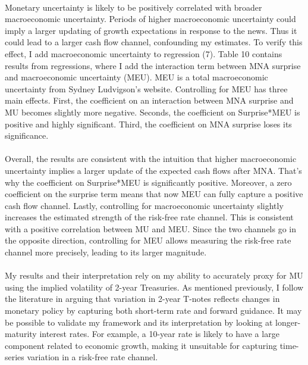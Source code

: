 \documentclass[12pt]{article}
\begin{document}
\paragraph{}
Monetary uncertainty is likely to be positively correlated with broader macroeconomic uncertainty. Periods of higher macroeconomic uncertainty could imply a larger updating of growth expectations in response to the news. Thus it could lead to a larger cash flow channel, confounding my estimates. To verify this effect, I add macroeconomic uncertainty to regression (7). Table 10 contains results from regressions, where I add the interaction term between MNA surprise and macroeconomic uncertainty (MEU). MEU is a total macroeconomic uncertainty from Sydney Ludvigson's website. Controlling for MEU has three main effects. First, the coefficient on an interaction between MNA surprise and MU becomes slightly more negative. Seconds, the coefficient on Surprise*MEU is positive and highly significant. Third, the coefficient on MNA surprise loses its significance.
\paragraph{}
Overall, the results are consistent with the intuition that higher macroeconomic uncertainty implies a larger update of the expected cash flows after MNA. That's why the coefficient on Surprise*MEU is significantly positive. Moreover, a zero coefficient on the surprise term means that now MEU can fully capture a positive cash flow channel. Lastly, controlling for macroeconomic uncertainty slightly increases the estimated strength of the risk-free rate channel. This is consistent with a positive correlation between MU and MEU. Since the two channels go in the opposite direction, controlling for MEU allows measuring the risk-free rate channel more precisely, leading to its larger magnitude. 
\paragraph{}
My results and their interpretation rely on my ability to accurately proxy for MU using the implied volatility of 2-year Treasuries. As mentioned previously, I follow the literature in arguing that variation in 2-year T-notes reflects changes in monetary policy by capturing both short-term rate and forward guidance. It may be possible to validate my framework and its interpretation by looking at longer-maturity interest rates. For example, a 10-year rate is likely to have a large component related to economic growth, making it unsuitable for capturing time-series variation in a risk-free rate channel.
\end{document}
